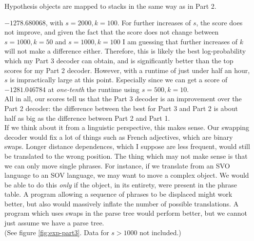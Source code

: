 \documentclass[answers]{exam}
\begin{document}
\begin{questions}
\begin{framed}
  Hypothesis objects are mapped to stacks in the same way as in Part 2.
\end{framed}


\addtocounter{question}{1}
\begin{framed}
  $-1278.680068$, with $s = 2000, k = 100$. For further increases of $s$,
  the score does not improve, and given the fact that the score does not change
  between $s = 1000, k = 50$ and $s = 1000, k = 100$ I am guessing that further
  increases of $k$ will not make a difference either.
  Therefore, this is likely the best log-probability which my Part 3 decoder can
  obtain, and is significantly better than the top scores for my Part 2 decoder.
  However, with a runtime of just under half an hour, $s$ is impractically large
  at this point. Especially since we can get a score of $-1281.046784$ at
  \emph{one-tenth} the runtime using $s = 500, k = 10$. 
  \\
  All in all, our scores tell us that the Part 3 decoder is an improvement over
  the Part 2 decoder: the difference between the best for Part 3 and Part 2 is
  about half as big as the difference between Part 2 and Part 1.
  \\
  If we think about it from a linguistic perspective, this makes sense. Our
  swapping decoder would fix a lot of things such as French adjectives, which
  are binary swaps. Longer distance dependences, which I suppose are less
  frequent, would still be translated to the wrong position. The thing which may
  not make sense is that we can only move single phrases. For instance, if we
  translate from an SVO language to an SOV language, we may want to move a
  complex object. We would be able to do this \emph{only} if the object, in its
  entirety, were present in the phrase table. A program allowing a sequence of
  phrases to be displaced might work better, but also would massively inflate
  the number of possible translations. A program which uses swaps in the parse
  tree would perform better, but we cannot just assume we have a parse tree.
  \\
  (See figure \ref{fig:exp-part3}. Data for $s > 1000$ not included.)
\end{framed}
\end{questions}


\end{document}
